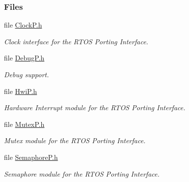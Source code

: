 \subsubsection*{Files}
\begin{DoxyCompactItemize}
\item 
file \hyperlink{_clock_p_8h}{Clock\+P.\+h}
\begin{DoxyCompactList}\small\item\em Clock interface for the R\+T\+O\+S Porting Interface. \end{DoxyCompactList}\item 
file \hyperlink{_debug_p_8h}{Debug\+P.\+h}
\begin{DoxyCompactList}\small\item\em Debug support. \end{DoxyCompactList}\item 
file \hyperlink{_hwi_p_8h}{Hwi\+P.\+h}
\begin{DoxyCompactList}\small\item\em Hardware Interrupt module for the R\+T\+O\+S Porting Interface. \end{DoxyCompactList}\item 
file \hyperlink{_mutex_p_8h}{Mutex\+P.\+h}
\begin{DoxyCompactList}\small\item\em Mutex module for the R\+T\+O\+S Porting Interface. \end{DoxyCompactList}\item 
file \hyperlink{_semaphore_p_8h}{Semaphore\+P.\+h}
\begin{DoxyCompactList}\small\item\em Semaphore module for the R\+T\+O\+S Porting Interface. \end{DoxyCompactList}\end{DoxyCompactItemize}

